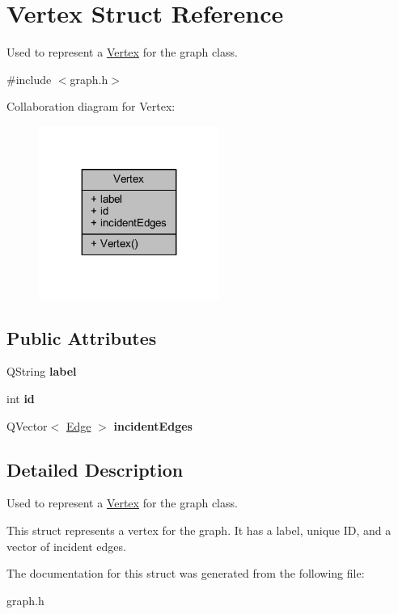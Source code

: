 \hypertarget{struct_vertex}{}\section{Vertex Struct Reference}
\label{struct_vertex}


Used to represent a \hyperlink{struct_vertex}{Vertex} for the graph class.  




{\ttfamily \#include $<$graph.\+h$>$}



Collaboration diagram for Vertex\+:
\nopagebreak
\begin{figure}[H]
\begin{center}
\leavevmode
\includegraphics[width=167pt]{struct_vertex__coll__graph}
\end{center}
\end{figure}
\subsection*{Public Attributes}
\begin{DoxyCompactItemize}
\item 
\mbox{\label{struct_vertex_a60447a604e4decc34e1ef4f89909ac97}} 
Q\+String {\bfseries label}
\item 
\mbox{\label{struct_vertex_a2e69697726190f50c7fc040fb1ddac7a}} 
int {\bfseries id}
\item 
\mbox{\label{struct_vertex_a925bd1413228b69ba059c58bfa96b43c}} 
Q\+Vector$<$ \hyperlink{struct_edge}{Edge} $>$ {\bfseries incident\+Edges}
\end{DoxyCompactItemize}


\subsection{Detailed Description}
Used to represent a \hyperlink{struct_vertex}{Vertex} for the graph class. 

This struct represents a vertex for the graph. It has a label, unique ID, and a vector of incident edges. 

The documentation for this struct was generated from the following file\+:\begin{DoxyCompactItemize}
\item 
graph.\+h\end{DoxyCompactItemize}
